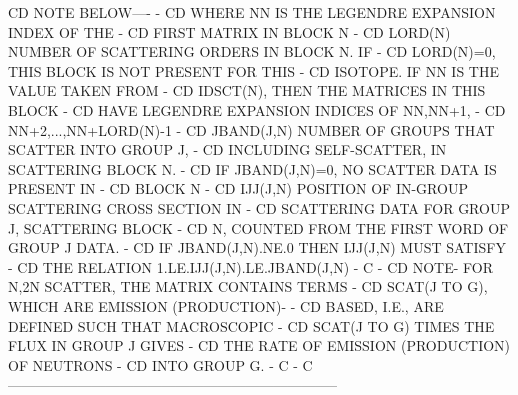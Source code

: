 \begin{ccode}
CD                              NOTE BELOW----                         -
CD                     WHERE NN IS THE LEGENDRE EXPANSION INDEX OF THE -
CD                     FIRST MATRIX IN BLOCK N                         -
CD    LORD(N)       NUMBER OF SCATTERING ORDERS IN BLOCK N.  IF        -
CD                     LORD(N)=0, THIS BLOCK IS NOT PRESENT FOR THIS   -
CD                     ISOTOPE.  IF NN IS THE VALUE TAKEN FROM         -
CD                     IDSCT(N), THEN THE MATRICES IN THIS BLOCK       -
CD                     HAVE LEGENDRE EXPANSION INDICES OF NN,NN+1,     -
CD                     NN+2,...,NN+LORD(N)-1                           -
CD    JBAND(J,N)    NUMBER OF GROUPS THAT SCATTER INTO GROUP J,        -
CD                     INCLUDING SELF-SCATTER, IN SCATTERING BLOCK N.  -
CD                     IF JBAND(J,N)=0, NO SCATTER DATA IS PRESENT IN  -
CD                     BLOCK N                                         -
CD    IJJ(J,N)      POSITION OF IN-GROUP SCATTERING CROSS SECTION IN   -
CD                     SCATTERING DATA FOR GROUP J, SCATTERING BLOCK   -
CD                     N, COUNTED FROM THE FIRST WORD OF GROUP J DATA. -
CD                     IF JBAND(J,N).NE.0 THEN IJJ(J,N) MUST SATISFY   -
CD                     THE RELATION 1.LE.IJJ(J,N).LE.JBAND(J,N)        -
C                                                                      -
CD                  NOTE- FOR N,2N SCATTER, THE MATRIX CONTAINS TERMS  -
CD                     SCAT(J TO G), WHICH ARE EMISSION (PRODUCTION)-  -
CD                     BASED, I.E., ARE DEFINED SUCH THAT MACROSCOPIC  -
CD                     SCAT(J TO G) TIMES THE FLUX IN GROUP J GIVES    -
CD                     THE RATE OF EMISSION (PRODUCTION) OF NEUTRONS   -
CD                     INTO GROUP G.                                   -
C                                                                      -
C-----------------------------------------------------------------------


\end{ccode}
